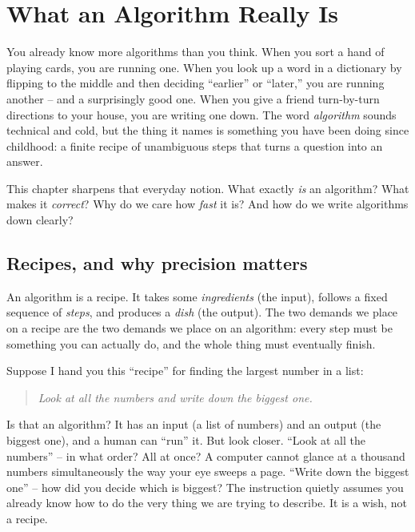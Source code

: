 \chapter{What an Algorithm Really Is}

You already know more algorithms than you think. When you sort a hand of playing
cards, you are running one. When you look up a word in a dictionary by flipping to
the middle and then deciding ``earlier'' or ``later,'' you are running another --
and a surprisingly good one. When you give a friend turn-by-turn directions to your
house, you are writing one down. The word \emph{algorithm} sounds technical and
cold, but the thing it names is something you have been doing since childhood: a
finite recipe of unambiguous steps that turns a question into an answer.

This chapter sharpens that everyday notion. What exactly \emph{is} an algorithm? What makes it \emph{correct}? Why do we care how \emph{fast} it is? And how do we write algorithms down clearly?

\chapterline

\section{Recipes, and why precision matters}

\begin{intuitionbox}
An algorithm is a recipe. It takes some \emph{ingredients} (the input), follows a
fixed sequence of \emph{steps}, and produces a \emph{dish} (the output). The two
demands we place on a recipe are the two demands we place on an algorithm:
every step must be something you can actually do, and the whole thing must
eventually finish.
\end{intuitionbox}

Suppose I hand you this ``recipe'' for finding the largest number in a list:

\begin{quote}
\emph{Look at all the numbers and write down the biggest one.}
\end{quote}

Is that an algorithm? It has an input (a list of numbers) and an output (the biggest
one), and a human can ``run'' it. But look closer. ``Look at all the numbers'' --
in what order? All at once? A computer cannot glance at a thousand numbers
simultaneously the way your eye sweeps a page. ``Write down the biggest one'' --
how did you decide which is biggest? The instruction quietly assumes you already
know how to do the very thing we are trying to describe. It is a wish, not a recipe.

